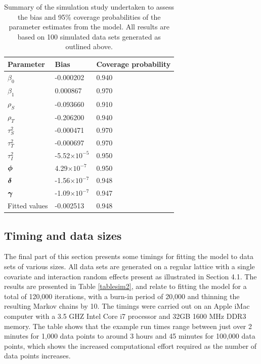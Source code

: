 \documentclass[article, nojss]{jss}
\newcommand{\bd}[1]{\ensuremath{\mbox{\boldmath $#1$}}}
\begin{document}
\begin{table}
\begin{center}
\begin{tabular}{lll}
\hline \textbf{Parameter}&\textbf{Bias}&\textbf{Coverage probability}\\\hline
$\beta_0$&-0.000202&0.940\\
$\beta_1$&0.000867&0.970\\
$\rho_S$ &-0.093660&0.910\\
$\rho_T$ &-0.206200&0.940\\
$\tau^2_S$ &-0.000471&0.970\\
$\tau^2_T$ &-0.000697&0.970\\
$\tau^2_I$ &-5.52$\times 10^{-5}$ & 0.950\\
$\bd{\phi}$ &4.29$\times 10^{-7}$ & 0.950\\
$\bd{\delta}$ &-1.56$\times 10^{-7}$ &0.948\\
$\bd{\gamma}$ &-1.09$\times 10^{-7}$ &0.947\\
Fitted values &-0.002513& 0.948\\\hline
\end{tabular}

\caption{Summary of the simulation study undertaken to assess the bias and 95\% coverage probabilities of the parameter estimates from the  model. All results are based on 100 simulated data sets generated as outlined above.\label{tablesim1}}
\end{center}
\end{table}







\subsection{Timing and data sizes}
The final part of this section presents some timings for fitting the  model to data sets of various sizes. All data sets are generated on a regular lattice with a single covariate and interaction random effects present as illustrated in Section 4.1. The results are presented in Table \ref{tablesim2}, and relate to fitting the model for a total of 120,000 iterations, with a burn-in period of 20,000 and thinning the resulting Markov chains by 10. The timings were carried out on an Apple iMac computer with a 3.5 GHZ Intel Core i7 processor and 32GB 1600 MHz DDR3 memory. The table shows that the example run times range between just over 2 minutes for 1,000 data points to around 3 hours and 45 minutes for 100,000 data points, which shows the increased computational effort required as the number of data points increases.
\end{document}
